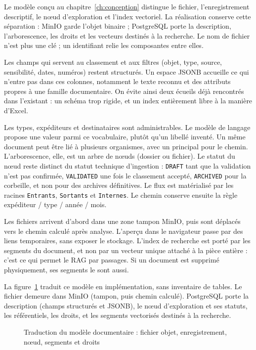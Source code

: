 Le modèle conçu au chapitre~\ref{ch:conception} distingue le fichier, l'enregistrement descriptif, le nœud d'exploration et l'index vectoriel. La réalisation conserve cette séparation : MinIO garde l'objet binaire ; PostgreSQL porte la description, l'arborescence, les droits et les vecteurs destinés à la recherche. Le nom de fichier n'est plus une clé ; un identifiant relie les composantes entre elles.

Les champs qui servent au classement et aux filtres (objet, type, source, sensibilité, dates, numéros) restent structurés. Un espace JSONB accueille ce qui n'entre pas dans ces colonnes, notamment le texte reconnu et des attributs propres à une famille documentaire. On évite ainsi deux écueils déjà rencontrés dans l'existant : un schéma trop rigide, et un index entièrement libre à la manière d'Excel.

Les types, expéditeurs et destinataires sont administrables. Le modèle de langage propose une valeur parmi ce vocabulaire, plutôt qu'un libellé inventé. Un même document peut être lié à plusieurs organismes, avec un principal pour le chemin. L'arborescence, elle, est un arbre de nœuds (dossier ou fichier). Le statut du nœud reste distinct du statut technique d'ingestion : \texttt{DRAFT} tant que la validation n'est pas confirmée, \texttt{VALIDATED} une fois le classement accepté, \texttt{ARCHIVED} pour la corbeille, et non pour des archives définitives. Le flux est matérialisé par les racines \texttt{Entrants}, \texttt{Sortants} et \texttt{Internes}. Le chemin conserve ensuite la règle expéditeur / type / année / mois.

Les fichiers arrivent d'abord dans une zone tampon MinIO, puis sont déplacés vers le chemin calculé après analyse. L'aperçu dans le navigateur passe par des liens temporaires, sans exposer le stockage. L'index de recherche est porté par les segments du document, et non par un vecteur unique attaché à la pièce entière : c'est ce qui permet le RAG par passages. Si un document est supprimé physiquement, ses segments le sont aussi.

La figure~\ref{fig:db-schema-postgres} traduit ce modèle en implémentation, sans inventaire de tables. Le fichier demeure dans MinIO (tampon, puis chemin calculé). PostgreSQL porte la description (champs structurés et JSONB), le nœud d'exploration et ses statuts, les référentiels, les droits, et les segments vectorisés destinés à la recherche.

\begin{figure}[H]
\centering

\caption{Traduction du modèle documentaire : fichier objet, enregistrement, nœud, segments et droits}
\label{fig:db-schema-postgres}
\end{figure}

